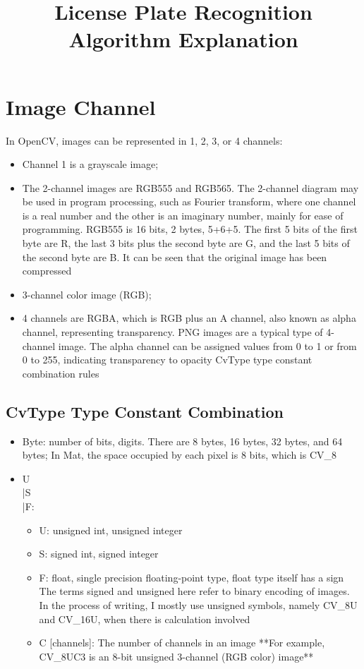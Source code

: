 \documentclass{article}
\title{License Plate Recognition Algorithm Explanation}
\begin{document}
	\maketitle
	
	\section{Image Channel}
	In OpenCV, images can be represented in 1, 2, 3, or 4 channels:
	\begin{itemize}
		\item Channel 1 is a grayscale image;
		\item The 2-channel images are RGB555 and RGB565. The 2-channel diagram may be used in program processing, such as Fourier transform, where one channel is a real number and the other is an imaginary number, mainly for ease of programming. RGB555 is 16 bits, 2 bytes, 5+6+5. The first 5 bits of the first byte are R, the last 3 bits plus the second byte are G, and the last 5 bits of the second byte are B. It can be seen that the original image has been compressed
		\item 3-channel color image (RGB);
		\item 4 channels are RGBA, which is RGB plus an A channel, also known as alpha channel, representing transparency. PNG images are a typical type of 4-channel image. The alpha channel can be assigned values from 0 to 1 or from 0 to 255, indicating transparency to opacity
		CvType type constant combination rules
	\end{itemize}
	
	\subsection{CvType Type Constant Combination}
	\begin{itemize}
		\item Byte: number of bits, digits. There are 8 bytes, 16 bytes, 32 bytes, and 64 bytes; In Mat, the space occupied by each pixel is 8 bits, which is CV\_8
		\item U\\|S\\|F:
		\begin{itemize}
			\item U: unsigned int, unsigned integer
			\item S: signed int, signed integer
			\item F: float, single precision floating-point type, float type itself has a sign
			The terms signed and unsigned here refer to binary encoding of images. In the process of writing, I mostly use unsigned symbols, namely CV\_8U and CV\_16U, when there is calculation involved
			\item C [channels]: The number of channels in an image
			**For example, CV\_8UC3 is an 8-bit unsigned 3-channel (RGB color) image**
		\end{itemize}
	\end{itemize}
	
\end{document}
